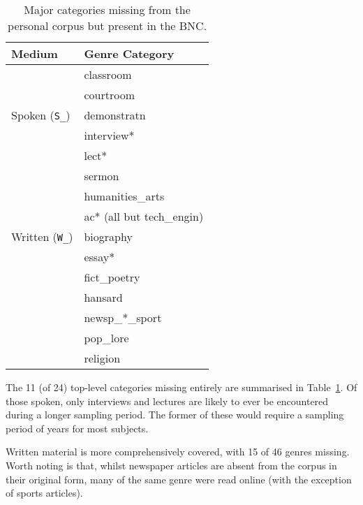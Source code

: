 \begin{table}[ht]
    \centering

    \begin{tabular}{ |l|l| }
        \hline
        Medium & Genre Category \\ \hline
        \multirow{5}{*}{Spoken (\texttt{S\_})} 
                                & classroom \\
                                & courtroom \\
                                & demonstratn \\
                                & interview* \\
                                & lect* \\
                                & sermon \\
        \hline
        \multirow{5}{*}{Written (\texttt{W\_})} 
                                & humanities\_arts \\
                                & ac* (all but tech\_engin) \\
                                & biography \\
                                & essay* \\
                                & fict\_poetry \\
                                & hansard \\
                                & newsp\_*\_sport \\
                                & pop\_lore \\
                                & religion \\
        \hline
    \end{tabular}
    \caption{Major categories missing from the personal corpus but present in the BNC.}
    \label{table:personal:missingcatspersonal}
\end{table}


The 11 (of 24) top-level categories missing entirely are summarised in Table~\ref{table:personal:missingcatspersonal}.  Of those spoken, only interviews and lectures are likely to ever be encountered during a longer sampling period.  The former of these would require a sampling period of years for most subjects.

Written material is more comprehensively covered, with 15 of 46 genres missing.  Worth noting is that, whilst newspaper articles are absent from the corpus in their original form, many of the same genre were read online (with the exception of sports articles).  




